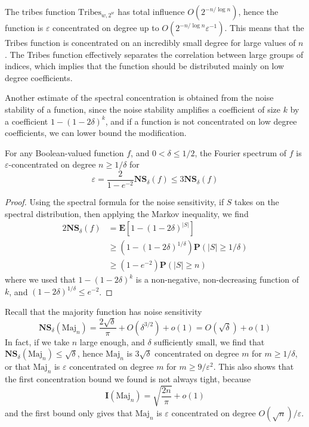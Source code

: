 \begin{example}
    The tribes function $\text{Tribes}_{w,2^w}$ has total influence $O(2^{-n/\log n})$, hence the function is $\varepsilon$ concentrated on degree up to $O(2^{-n/\log n} \varepsilon^{-1})$. This means that the Tribes function is concentrated on an incredibly small degree for large values of $n$. The Tribes function effectively separates the correlation between large groups of indices, which implies that the function should be distributed mainly on low degree coefficients.
\end{example}

Another estimate of the spectral concentration is obtained from the noise stability of a function, since the noise stability amplifies a coefficient of size $k$ by a coefficient $1 - (1 - 2\delta)^k$, and if a function is not concentrated on low degree coefficients, we can lower bound the modification.

\begin{theorem}
    For any Boolean-valued function $f$, and $0 < \delta \leq 1/2$, the Fourier spectrum of $f$ is $\varepsilon$-concentrated on degree $n \geq 1/\delta$ for
    \[ \varepsilon = \frac{2}{1 - e^{-2}} \mathbf{NS}_\delta(f) \leq 3 \mathbf{NS}_\delta(f) \]
\end{theorem}
\begin{proof}
    Using the spectral formula for the noise sensitivity, if $S$ takes on the spectral distribution, then applying the Markov inequality, we find
    \begin{align*}
        2 \mathbf{NS}_\delta(f) &= \mathbf{E}[1 - (1 - 2\delta)^{|S|}]\\
        &\geq (1 - (1 - 2\delta)^{1/\delta}) \mathbf{P}(|S| \geq 1/\delta)\\
        &\geq (1 - e^{-2}) \mathbf{P}(|S| \geq n)
    \end{align*}
    where we used that $1 - (1 - 2\delta)^k$ is a non-negative, non-decreasing function of $k$, and $(1 - 2\delta)^{1/\delta} \leq e^{-2}$.
\end{proof}

\begin{example}
    Recall that the majority function has noise sensitivity
    \[ \mathbf{NS}_\delta(\text{Maj}_n) = \frac{2 \sqrt{\delta}}{\pi} + O(\delta^{3/2}) + o(1) = O(\sqrt{\delta}) + o(1) \]
    In fact, if we take $n$ large enough, and $\delta$ sufficiently small, we find that $\mathbf{NS}_\delta(\text{Maj}_n) \leq \sqrt{\delta}$, hence $\text{Maj}_n$ is $3\sqrt{\delta}$ concentrated on degree $m$ for $m \geq 1/\delta$, or that $\text{Maj}_n$ is $\varepsilon$ concentrated on degree $m$ for $m \geq 9/\varepsilon^2$. This also shows that the first concentration bound we found is not always tight, because
    \[ \mathbf{I}(\text{Maj}_n) = \sqrt{\frac{2n}{\pi}} + o(1) \]
    and the first bound only gives that $\text{Maj}_n$ is $\varepsilon$ concentrated on degree $O(\sqrt{n})/\varepsilon$.
\end{example}

